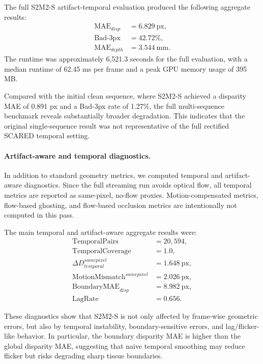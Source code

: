 \documentclass[11pt,a4paper]{article}
\begin{document}
The full S2M2-S artifact-temporal evaluation produced the following aggregate
results:
\[
\begin{aligned}
\mathrm{MAE}_{disp} &= 6.829~\mathrm{px}, \\
\mathrm{Bad}\text{-}3\mathrm{px} &= 42.72\%, \\
\mathrm{MAE}_{depth} &= 3.544~\mathrm{mm}.
\end{aligned}
\]
The runtime was approximately 6,521.3 seconds for the full evaluation, with a
median runtime of 62.45 ms per frame and a peak GPU memory usage of 395 MB.

Compared with the initial clean sequence, where S2M2-S achieved a disparity MAE
of 0.891 px and a Bad-3px rate of 1.27\%, the full multi-sequence benchmark
reveals substantially broader degradation. This indicates that the original
single-sequence result was not representative of the full rectified SCARED
temporal setting.

\paragraph{Artifact-aware and temporal diagnostics.}
In addition to standard geometry metrics, we computed temporal and artifact-aware
diagnostics. Since the full streaming run avoids optical flow, all temporal
metrics are reported as same-pixel, no-flow proxies. Motion-compensated metrics,
flow-based ghosting, and flow-based occlusion metrics are intentionally not
computed in this pass.

The main temporal and artifact-aware aggregate results were:
\[
\begin{aligned}
\mathrm{TemporalPairs} &= 20{,}594, \\
\mathrm{TemporalCoverage} &= 1.0, \\
\Delta D^{samepixel}_{temporal} &= 1.648~\mathrm{px}, \\
\mathrm{MotionMismatch}^{samepixel} &= 2.026~\mathrm{px}, \\
\mathrm{BoundaryMAE}_{disp} &= 8.982~\mathrm{px}, \\
\mathrm{LagRate} &= 0.656.
\end{aligned}
\]

These diagnostics show that S2M2-S is not only affected by frame-wise geometric
errors, but also by temporal instability, boundary-sensitive errors, and
lag/flicker-like behavior. In particular, the boundary disparity MAE is higher
than the global disparity MAE, suggesting that naive temporal smoothing may
reduce flicker but risks degrading sharp tissue boundaries.
\end{document}
